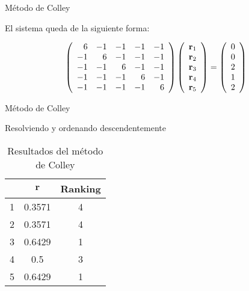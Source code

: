 \documentclass[10pt,hyperref={unicode}]{beamer}
\begin{document}
	\begin{frame}{Método de Colley}
		\begin{ejemplo}[continuación]
			El sistema queda de la siguiente forma:
			
			\begin{equation*}
			\left(\begin{array}{r r r r r}
			6 & -1 & -1 & -1 & -1\\
			-1 &  6 & -1 & -1 & -1\\
			-1 & -1 &  6 & -1 & -1\\
			-1 & -1 & -1 &  6 & -1\\
			-1 & -1 & -1 & -1 &  6
			\end{array}\right)
			\left(\begin{array}{c}
			\mathbf{r}_1\\
			\mathbf{r}_2\\
			\mathbf{r}_3\\
			\mathbf{r}_4\\
			\mathbf{r}_5
			\end{array}\right)
			=
			\left(\begin{array}{c}
			0\\
			0\\
			2\\
			1\\
			2
			\end{array}\right)
			\end{equation*}
		\end{ejemplo}
		
	\end{frame}
	
	\begin{frame}{Método de Colley}
		\begin{ejemplo}[continuación]
			Resolviendo y ordenando descendentemente
			
			\begin{table}[h]
				\centering
				\caption{Resultados del método de Colley}
				\label{tbl:colley_con_empates}
				\begin{tabular}{@{}ccc@{}}
					\cmidrule(l){2-3}
					& $\mathbf{r}$ & Ranking \\ \midrule
					1 & 0.3571       & 4       \\
					2 & 0.3571       & 4       \\
					3 & 0.6429       & 1       \\
					4 & 0.5          & 3       \\
					5 & 0.6429       & 1       \\ \bottomrule
				\end{tabular}
			\end{table}
		\end{ejemplo}
		
	\end{frame}
	
\end{document}
